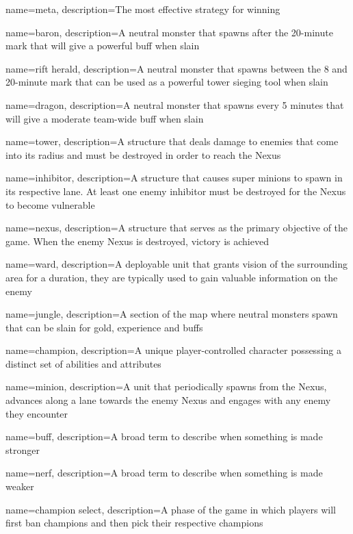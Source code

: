 
{
    name=meta,
    description={The most effective strategy for winning}
}

{
    name=baron,
    description={A neutral monster that spawns after the 20-minute mark that will give a powerful buff when slain}
}

{
    name=rift herald,
    description={A neutral monster that spawns between the 8 and 20-minute mark that can be used as a powerful tower sieging tool when slain}
}

{
    name=dragon,
    description={A neutral monster that spawns every 5 minutes that will give a moderate team-wide buff when slain}
}

{
    name=tower,
    description={A structure that deals damage to enemies that come into its radius and must be destroyed in order to reach the Nexus}
}

{
    name=inhibitor,
    description={A structure that causes super minions to spawn in its respective lane. At least one enemy inhibitor must be destroyed for the Nexus to become vulnerable}
}

{
    name=nexus,
    description={A structure that serves as the primary objective of the game.
    When the enemy Nexus is destroyed, victory is achieved}
}

{
    name=ward,
    description={A deployable unit that grants vision of the surrounding area for a duration, they are typically used to gain valuable information on the enemy}
}

{
    name=jungle,
    description={A section of the map where neutral monsters spawn that can be slain for gold, experience and buffs}
}

{
    name=champion,
    description={A unique player-controlled character possessing a distinct set of abilities and attributes}
}

{
    name=minion,
    description={A unit that periodically spawns from the Nexus, advances along a lane towards the enemy Nexus and engages with any enemy they encounter}
}

{
    name=buff,
    description={A broad term to describe when something is made stronger}
}

{
    name=nerf,
    description={A broad term to describe when something is made weaker}
}

{
    name=champion select,
    description={A phase of the game in which players will first ban champions and then pick their respective champions}
}